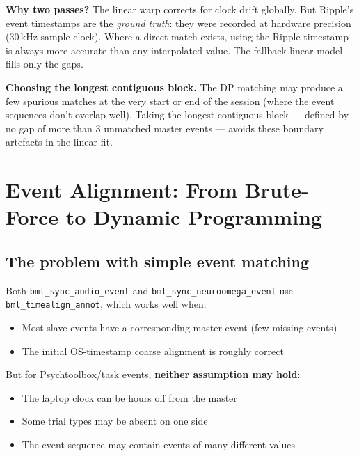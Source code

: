 \documentclass[11pt, a4paper]{article}
\begin{document}
\begin{notebox}
  \textbf{Why two passes?}
  The linear warp corrects for clock drift globally. But Ripple's event timestamps are the \emph{ground truth}: they were recorded at hardware precision (30\,kHz sample clock). Where a direct match exists, using the Ripple timestamp is always more accurate than any interpolated value. The fallback linear model fills only the gaps.
\end{notebox}

\begin{warnbox}
  \textbf{Choosing the longest contiguous block.} The DP matching may produce a few spurious matches at the very start or end of the session (where the event sequences don't overlap well). Taking the longest contiguous block --- defined by no gap of more than 3 unmatched master events --- avoids these boundary artefacts in the linear fit.
\end{warnbox}

\section{Event Alignment: From Brute-Force to Dynamic Programming}
\label{sec:dp}

\subsection{The problem with simple event matching}

Both \texttt{bml\_sync\_audio\_event} and \texttt{bml\_sync\_neuroomega\_event} use \texttt{bml\_timealign\_annot}, which works well when:
\begin{itemize}
  \item Most slave events have a corresponding master event (few missing events)
  \item The initial OS-timestamp coarse alignment is roughly correct
\end{itemize}

But for Psychtoolbox/task events, \textbf{neither assumption may hold}:
\begin{itemize}
  \item The laptop clock can be hours off from the master
  \item Some trial types may be absent on one side
  \item The event sequence may contain events of many different values
\end{itemize}
\end{document}
